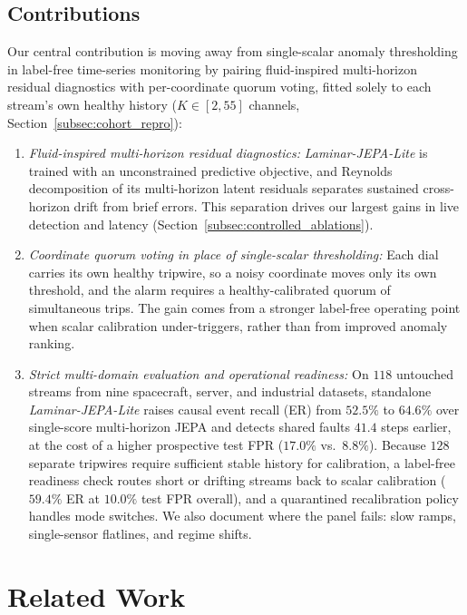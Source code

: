 \documentclass[journal]{IEEEtran}
\begin{document}
\subsection{Contributions}
Our central contribution is moving away from single-scalar anomaly thresholding in label-free time-series monitoring by pairing fluid-inspired multi-horizon residual diagnostics with per-coordinate quorum voting, fitted solely to each stream's own healthy history ($K\in[2,55]$ channels, Section~\ref{subsec:cohort_repro}):
\begin{enumerate}[leftmargin=*, nosep, itemsep=1pt]
    \item \emph{Fluid-inspired multi-horizon residual diagnostics:} \emph{Laminar-JEPA-Lite} is trained with an unconstrained predictive objective, and Reynolds decomposition of its multi-horizon latent residuals separates sustained cross-horizon drift from brief errors. This separation drives our largest gains in live detection and latency (Section~\ref{subsec:controlled_ablations}).
    \item \emph{Coordinate quorum voting in place of single-scalar thresholding:} Each dial carries its own healthy tripwire, so a noisy coordinate moves only its own threshold, and the alarm requires a healthy-calibrated quorum of simultaneous trips. The gain comes from a stronger label-free operating point when scalar calibration under-triggers, rather than from improved anomaly ranking.
    \item \emph{Strict multi-domain evaluation and operational readiness:} On $118$ untouched streams from nine spacecraft, server, and industrial datasets, standalone \emph{Laminar-JEPA-Lite} raises causal event recall (ER) from $52.5\%$ to $64.6\%$ over single-score multi-horizon JEPA and detects shared faults $41.4$ steps earlier, at the cost of a higher prospective test FPR ($17.0\%$ vs.\ $8.8\%$). Because $128$ separate tripwires require sufficient stable history for calibration, a label-free readiness check routes short or drifting streams back to scalar calibration ($59.4\%$ ER at $10.0\%$ test FPR overall), and a quarantined recalibration policy handles mode switches. We also document where the panel fails: slow ramps, single-sensor flatlines, and regime shifts.
\end{enumerate}

\section{Related Work}
\label{sec:related}
\end{document}

